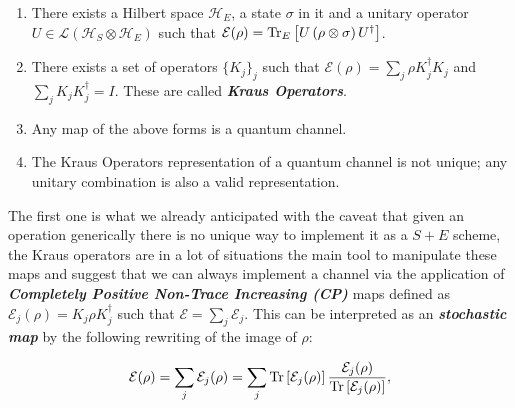 \begin{enumerate}
  \item There exists a Hilbert space $\mathcal{H}_{E}$, a state $\sigma$ in it and a unitary operator $U \in\mathcal{L}(\mathcal{H}_{S}\otimes\mathcal{H}_{E})$ such that $\mathcal{E}(\rho) = \mathrm{Tr}_{E}\left[U\left(\rho\otimes\sigma\right)U^{\dagger}\right]$.
  \item There exists a set of operators $\{K_{j} \}_{j}$ such that $\mathcal{E}(\rho) = \sum_{j}\rho K_{j}^{\dagger}K_{j}$ and $\sum_{j}K_{j}K_{j}^{\dagger}=I$. These are called \textit{\textbf{Kraus Operators}}.
  \item Any map of the above forms is a quantum channel.
  \item The Kraus Operators representation of a quantum channel is not unique; any unitary combination is also a valid representation.
\end{enumerate}
The first one is what we already anticipated with the caveat that given an operation generically there is no unique way to implement it as
a $S+E$ scheme, the Kraus operators are in a lot of situations the main tool to manipulate these maps and suggest that we can
always implement a channel via the application of \textbf{\textit{Completely Positive Non-Trace Increasing (CP)}} maps  defined as $\mathcal{E}_{j}(\rho)=K_{j}\rho K_{j}^{\dagger}$ such that $\mathcal{E} = \sum_{j}\mathcal{E}_{j}$. This can be interpreted as an \textbf{\textit{stochastic map}} \cite{nielsen_quantum_2010} by the following
rewriting of the image of $\rho$:

\begin{equation}
  \mathcal{E}(\rho) = \sum_{j}\mathcal{E}_{j}(\rho) = \sum_{j}\mathrm{Tr}\left[\mathcal{E}_{j}(\rho)\right]\frac{\mathcal{E}_{j}(\rho)}{\mathrm{Tr}\left[\mathcal{E}_{j}(\rho)\right]},
\end{equation}

